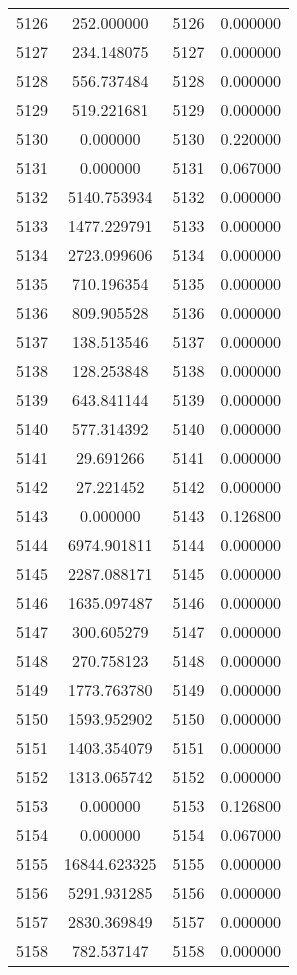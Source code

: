 \documentclass[12pt]{article}
\begin{document}
\begin{longtable}{@{}cccc@{}}
5126 & 252.000000 & 5126 & 0.000000 \\
5127 & 234.148075 & 5127 & 0.000000 \\
5128 & 556.737484 & 5128 & 0.000000 \\
5129 & 519.221681 & 5129 & 0.000000 \\
5130 & 0.000000 & 5130 & 0.220000 \\
5131 & 0.000000 & 5131 & 0.067000 \\
5132 & 5140.753934 & 5132 & 0.000000 \\
5133 & 1477.229791 & 5133 & 0.000000 \\
5134 & 2723.099606 & 5134 & 0.000000 \\
5135 & 710.196354 & 5135 & 0.000000 \\
5136 & 809.905528 & 5136 & 0.000000 \\
5137 & 138.513546 & 5137 & 0.000000 \\
5138 & 128.253848 & 5138 & 0.000000 \\
5139 & 643.841144 & 5139 & 0.000000 \\
5140 & 577.314392 & 5140 & 0.000000 \\
5141 & 29.691266 & 5141 & 0.000000 \\
5142 & 27.221452 & 5142 & 0.000000 \\
5143 & 0.000000 & 5143 & 0.126800 \\
5144 & 6974.901811 & 5144 & 0.000000 \\
5145 & 2287.088171 & 5145 & 0.000000 \\
5146 & 1635.097487 & 5146 & 0.000000 \\
5147 & 300.605279 & 5147 & 0.000000 \\
5148 & 270.758123 & 5148 & 0.000000 \\
5149 & 1773.763780 & 5149 & 0.000000 \\
5150 & 1593.952902 & 5150 & 0.000000 \\
5151 & 1403.354079 & 5151 & 0.000000 \\
5152 & 1313.065742 & 5152 & 0.000000 \\
5153 & 0.000000 & 5153 & 0.126800 \\
5154 & 0.000000 & 5154 & 0.067000 \\
5155 & 16844.623325 & 5155 & 0.000000 \\
5156 & 5291.931285 & 5156 & 0.000000 \\
5157 & 2830.369849 & 5157 & 0.000000 \\
5158 & 782.537147 & 5158 & 0.000000 \\

\end{longtable}
\end{document}
